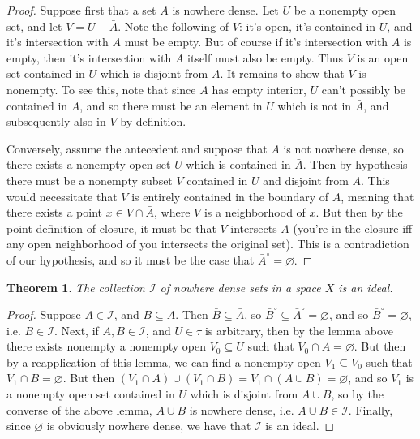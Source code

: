 \documentclass{article}
\theoremstyle{definition}
\theoremstyle{plain}
\theoremstyle{theorem}
\newtheorem{theorem}{Theorem}[section]
\begin{document}
\begin{proof}
	Suppose first that a set $A$ is nowhere dense. Let $U$ be a nonempty open set, and let $V = U-\bar{A}$. Note the following of $V$: it's open, it's contained in $U$, and it's intersection with $\bar{A}$ must be empty. But of course if it's intersection with $\bar{A}$ is empty, then it's intersection with $A$ itself must also be empty. Thus $V$ is an open set contained in $U$ which is disjoint from $A$. It remains to show that $V$ is nonempty. To see this, note that since $\bar{A}$ has empty interior, $U$ can't possibly be contained in $A$, and so there must be an element in $U$ which is not in $\bar{A}$, and subsequently also in $V$ by definition.
	\par Conversely, assume the antecedent and suppose that $A$ is not nowhere dense, so there exists a nonempty open set $U$ which is contained in $\bar{A}$. Then by hypothesis there must be a nonempty subset $V$ contained in $U$ and disjoint from $A$. This would necessitate that $V$ is entirely contained in the boundary of $A$, meaning that there exists a point $x \in V \cap \bar{A}$, where $V$ is a neighborhood of $x$. But then by the point-definition of closure, it must be that $V$ intersects $A$ (you're in the closure iff any open neighborhood of you intersects the original set). This is a contradiction of our hypothesis, and so it must be the case that $\bar{A}^{\circ} = \varnothing$. 
\end{proof}
\begin{theorem}
	The collection $\mathcal{I}$ of nowhere dense sets in a space $X$ is an ideal. 
\end{theorem}
\begin{proof}
	Suppose $A \in \mathcal{I}$, and $B \subseteq A$. Then $\bar{B} \subseteq \bar{A}$, so $\bar{B}^{\circ} \subseteq \bar{A}^{\circ} = \varnothing$, and so $\bar{B}^{\circ} = \varnothing$, i.e. $B \in \mathcal{I}$. Next, if $A,B \in \mathcal{I}$, and $U \in \tau$ is arbitrary, then by the lemma above there exists nonempty a nonempty open $V_0 \subseteq U$ such that $V_0 \cap A = \varnothing$. But then by a reapplication of this lemma, we can find a nonempty open $V_1 \subseteq V_0$ such that $V_1 \cap B = \varnothing$. But then $(V_1 \cap A)\cup (V_1 \cap B) = V_1 \cap (A\cup B) = \varnothing$, and so $V_1$ is a nonempty open set contained in $U$ which is disjoint from $A \cup B$, so by the converse of the above lemma, $A \cup B$ is nowhere dense, i.e. $A\cup B \in \mathcal{I}$. Finally, since $\varnothing$ is obviously nowhere dense, we have that $\mathcal{I}$ is an ideal.   
\end{proof}
\end{document}
